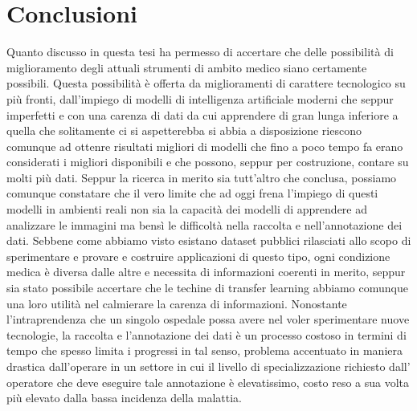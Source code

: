 \chapter{Conclusioni}

Quanto discusso in questa tesi ha permesso di
accertare che delle possibilità di miglioramento
degli attuali strumenti di ambito medico
siano certamente possibili.
Questa possibilità è offerta da miglioramenti
di carattere tecnologico su più fronti,
dall'impiego di modelli di intelligenza
artificiale moderni che seppur imperfetti
e con una carenza di dati da cui apprendere
di gran lunga inferiore a quella che
solitamente ci si aspetterebba si abbia
a disposizione riescono comunque ad ottenre
risultati migliori di modelli che fino
a poco tempo fa erano considerati
i migliori disponibili e che possono,
seppur per costruzione, contare su
molti più dati.
Seppur la ricerca in merito sia tutt'altro
che conclusa, possiamo comunque
constatare che il vero limite che ad 
oggi frena l'impiego di questi modelli
in ambienti reali non sia la capacità
dei modelli di apprendere ad analizzare
le immagini ma bensì le difficoltà
nella raccolta e nell'annotazione
dei dati.
Sebbene come abbiamo visto esistano
dataset pubblici rilasciati allo scopo
di sperimentare e provare e costruire
applicazioni di questo tipo, ogni
condizione medica è diversa dalle altre
e necessita di informazioni coerenti in
merito, seppur sia stato possibile
accertare che le techine di transfer
learning abbiamo comunque una loro
utilità nel calmierare la carenza di 
informazioni.
Nonostante l'intraprendenza che un
singolo ospedale possa avere nel
voler sperimentare nuove tecnologie,
la raccolta e l'annotazione dei dati
è un processo costoso in termini di
tempo che spesso limita i progressi
in tal senso, problema accentuato
in maniera drastica dall'operare in
un settore in cui il livello di
specializzazione richiesto dall'
operatore che deve eseguire tale
annotazione è elevatissimo, costo
reso a sua volta più elevato dalla
bassa incidenza della malattia.

